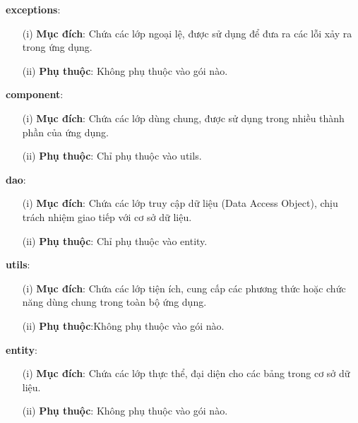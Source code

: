 \documentclass[../DoAn.tex]{subfiles}
\begin{document}
\textbf{exceptions}:
\begin{enumerate}
    \item [(i)]\textbf{Mục đích}: Chứa các lớp ngoại lệ, được sử dụng để đưa ra các lỗi xảy ra trong ứng dụng.
    \item [(ii)]\textbf{Phụ thuộc}: Không phụ thuộc vào gói nào.
\end{enumerate}

\textbf{component}:
\begin{enumerate}
    \item [(i)]\textbf{Mục đích}: Chứa các lớp dùng chung, được sử dụng trong nhiều thành phần của ứng dụng.
    \item [(ii)]\textbf{Phụ thuộc}: Chỉ phụ thuộc vào utils.
\end{enumerate}

\textbf{dao}:
\begin{enumerate}
    \item [(i)]\textbf{Mục đích}: Chứa các lớp truy cập dữ liệu (Data Access Object), chịu trách nhiệm giao tiếp với cơ sở dữ liệu.
    \item [(ii)]\textbf{Phụ thuộc}: Chỉ phụ thuộc vào entity.
\end{enumerate}

\textbf{utils}:
\begin{enumerate}
    \item [(i)]\textbf{Mục đích}: Chứa các lớp tiện ích, cung cấp các phương thức hoặc chức năng dùng chung trong toàn bộ ứng dụng.
    \item [(ii)]\textbf{Phụ thuộc}:Không phụ thuộc vào gói nào.
\end{enumerate}

\textbf{entity}:
\begin{enumerate}
    \item [(i)]\textbf{Mục đích}: Chứa các lớp thực thể, đại diện cho các bảng trong cơ sở dữ liệu.
    \item [(ii)]\textbf{Phụ thuộc}: Không phụ thuộc vào gói nào.
\end{enumerate}
\end{document}

